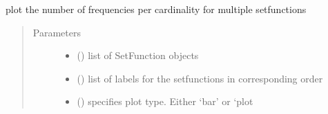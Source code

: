 \documentclass[letterpaper,10pt,english]{sphinxmanual}
\begin{document}
\begin{fulllineitems}
\label{\detokenize{setFTs:setFTs.plotting.plot_freq_card_multi}}
\sphinxAtStartPar
plot the number of frequencies per cardinality for multiple setfunctions
\begin{quote}\begin{description}
\item[{Parameters}] \leavevmode\begin{itemize}
\item {} 
\sphinxAtStartPar
{} (\sphinxstyleliteralemphasis{\sphinxupquote{{[}}}\sphinxstyleliteralemphasis{\sphinxupquote{{]}}}) \textendash{} list of SetFunction objects

\item {} 
\sphinxAtStartPar
{} (\sphinxstyleliteralemphasis{\sphinxupquote{{[}}}\sphinxstyleliteralemphasis{\sphinxupquote{{]}}}) \textendash{} list of labels for the setfunctions in corresponding order

\item {} 
\sphinxAtStartPar
{} () \textendash{} specifies plot type. Either ‘bar’ or ‘plot

\end{itemize}

\end{description}\end{quote}

\end{fulllineitems}

\end{document}
